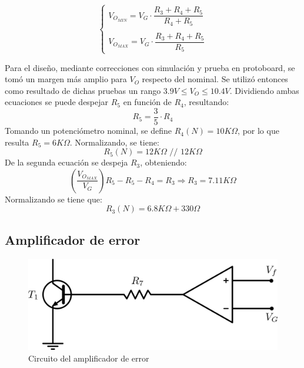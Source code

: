 \[
\left\lbrace
\begin{array}{l}
V_{O_{MIN}} = V_G \cdot \dfrac{R_3+R_4+R_5}{R_4+R_5}\\ \\
V_{O_{MAX}} = V_G \cdot \dfrac{R_3+R_4+R_5}{R_5}
\end{array}
\right.
\]

Para el dise\~no, mediante correcciones con simulaci\'on y prueba en protoboard, se tom\'o un margen m\'as amplio para $V_O$ respecto del nominal. Se utiliz\'o entonces como resultado de dichas pruebas un rango $3.9V \leq V_O \leq 10.4V$. Dividiendo ambas ecuaciones se puede despejar $R_5$ en funci\'on de $R_4$, resultando:
\[
R_5 = \frac{3}{5} \cdot R_4
\]
Tomando un potenci\'ometro nominal, se define $R_4(N) = 10K\Omega$, por lo que resulta $R_5 = 6K\Omega$. Normalizando, se tiene:
\[
R_5(N) = 12K\Omega \textrm{ // } 12K\Omega
\]
De la segunda ecuaci\'on se despeja $R_3$, obteniendo:
\[
\left(\frac{V_{O_{MAX}}}{V_G}\right)R_5 - R_5 - R_4 = R_3 \Longrightarrow R_3 = 7.11K\Omega
\]
Normalizando se tiene que: 
\[
R_3(N) = 6.8K\Omega + 330\Omega
\]

\subsection{Amplificador de error}

\begin{figure}[!ht]
\begin{centering}
\includegraphics[scale=0.5]{Imagenes/CircuitoError.png}
\par\end{centering}
\caption{Circuito del amplificador de error}

\end{figure}


